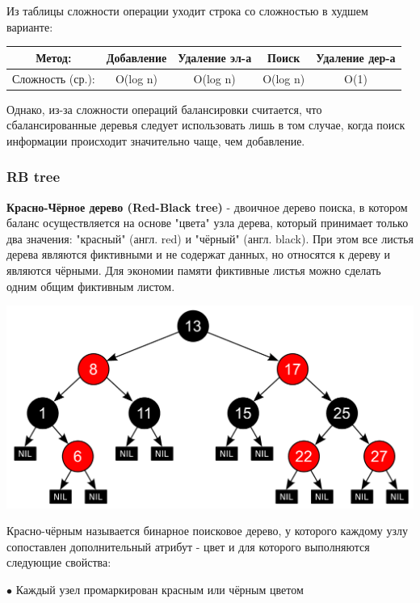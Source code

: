 \documentclass[utf8,14pt,a4paper,oneside,russian]{book}
\begin{document}
	Из таблицы сложности операции уходит строка со сложностью в худшем варианте:
	
	\begin{longtable}{c|c|c|c|c}
		Метод: &Добавление&Удаление эл-а&Поиск&Удаление дер-а\\\hline
		Сложность (ср.): &O(log n)&O(log n)&O(log n)&O(1)\\
	\end{longtable}

	Однако, из-за сложности операций балансировки считается, что сбалансированные деревья
	следует использовать лишь в том случае, когда поиск информации происходит значительно
	чаще, чем добавление. 
	
	\subsubsection{RB tree}
	
	\textbf{Красно-Чёрное дерево (Red-Black tree)} - двоичное дерево поиска, в котором баланс осуществляется на основе "цвета" узла дерева, который принимает только два значения: "красный" (англ. red) и "чёрный" (англ. black). При этом все листья дерева являются фиктивными и не содержат данных, но относятся к дереву и являются чёрными. Для экономии памяти фиктивные листья можно сделать одним общим фиктивным листом.
	
	\begin{center}
		\includegraphics[scale=0.45]{rb_tree}\\
	\end{center}
	
	Красно-чёрным называется бинарное поисковое дерево, у которого каждому узлу сопоставлен дополнительный атрибут - цвет и для которого выполняются следующие свойства:
	
	$\bullet$ Каждый узел промаркирован красным или чёрным цветом
	
\end{document}
